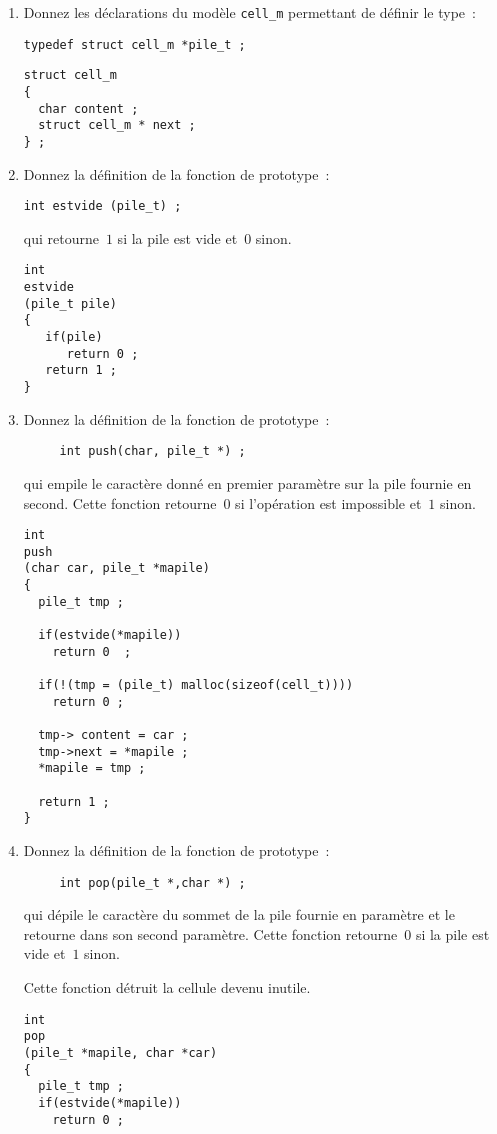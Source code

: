 \begin{enumerate}
\item Donnez les d\'eclarations du mod\`ele \verb+cell_m+ 
permettant de d\'efinir le type~:
\begin{verbatim}
typedef struct cell_m *pile_t ;
\end{verbatim}
\ifcorrection
\begin{verbatim}
struct cell_m
{
  char content ;
  struct cell_m * next ;
} ;
\end{verbatim}
\fi
\item Donnez la d\'efinition de la fonction de prototype~:
\begin{verbatim}
int estvide (pile_t) ;
\end{verbatim}
qui retourne~$1$ si la pile est vide et~$0$ sinon.
\ifcorrection
\begin{verbatim}
int
estvide
(pile_t pile) 
{
   if(pile)
      return 0 ;
   return 1 ;
} 
\end{verbatim}
\fi
\item Donnez la d\'efinition de la fonction de prototype~:
\begin{verbatim}
     int push(char, pile_t *) ;
\end{verbatim}
  qui empile le caract\`ere donn\'e en premier param\`etre sur la pile
  fournie en second. Cette fonction retourne~$0$ si l'op\'eration est impossible et~$1$ sinon.
\ifcorrection
  \begin{correction}
\begin{verbatim}
int
push
(char car, pile_t *mapile)
{
  pile_t tmp ;

  if(estvide(*mapile))
    return 0  ;

  if(!(tmp = (pile_t) malloc(sizeof(cell_t))))
    return 0 ;

  tmp-> content = car ;
  tmp->next = *mapile ;
  *mapile = tmp ;

  return 1 ;
}
\end{verbatim}
  \end{correction}
\fi
\item Donnez la d\'efinition de la fonction de prototype~:
\begin{verbatim}
     int pop(pile_t *,char *) ;
\end{verbatim}
  qui d\'epile le caract\`ere du sommet de la pile fournie en param\`etre et
  le retourne dans son second param\`etre. Cette fonction retourne~$0$
  si la pile est vide et~$1$ sinon.
  \par
  Cette fonction d\'etruit la cellule devenu inutile.
\ifcorrection
  \begin{correction}
\begin{verbatim}
int 
pop
(pile_t *mapile, char *car)
{
  pile_t tmp ;
  if(estvide(*mapile))
    return 0 ;


\end{verbatim}
\end{correction}
\end{enumerate}
